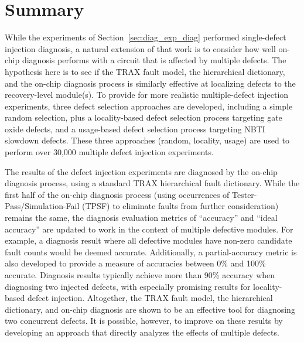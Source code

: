\section{Summary}
\label{sec:multi_summary}

While the experiments of Section~\ref{sec:diag_exp_diag} performed single-defect injection diagnosis, a natural extension of that work is to consider how well on-chip diagnosis performs with a circuit that is affected by multiple defects.
%
The hypothesis here is to see if the TRAX fault model, the hierarchical dictionary, and the on-chip diagnosis process is similarly effective at localizing defects to the recovery-level module(s).
%
To provide for more realistic multiple-defect injection experiments, three defect selection approaches are developed, including a simple random selection, plus a locality-based defect selection process targeting gate oxide defects, and a usage-based defect selection process targeting NBTI slowdown defects.
%
These three approaches (random, locality, usage) are used to perform over 30,000 multiple defect injection experiments.

The results of the defect injection experiments are diagnosed by the on-chip diagnosis process, using a standard TRAX hierarchical fault dictionary.
%
While the first half of the on-chip diagnosis process (using occurrences of Tester-Pass/Simulation-Fail (TPSF) to eliminate faults from further consideration) remains the same, the diagnosis evaluation metrics of ``accuracy'' and ``ideal accuracy'' are updated to work in the context of multiple defective modules.
%
For example, a diagnosis result where all defective modules have non-zero candidate fault counts would be deemed accurate.
%
Additionally, a partial-accuracy metric is also developed to provide a measure of accuracies between 0\% and 100\% accurate.
%
Diagnosis results typically achieve more than 90\% accuracy when diagnosing two injected defects, with especially promising results for locality-based defect injection.
%
Altogether, the TRAX fault model, the hierarchical dictionary, and on-chip diagnosis are shown to be an effective tool for diagnosing two concurrent defects.
%
It is possible, however, to improve on these results by developing an approach that directly analyzes the effects of multiple defects.

